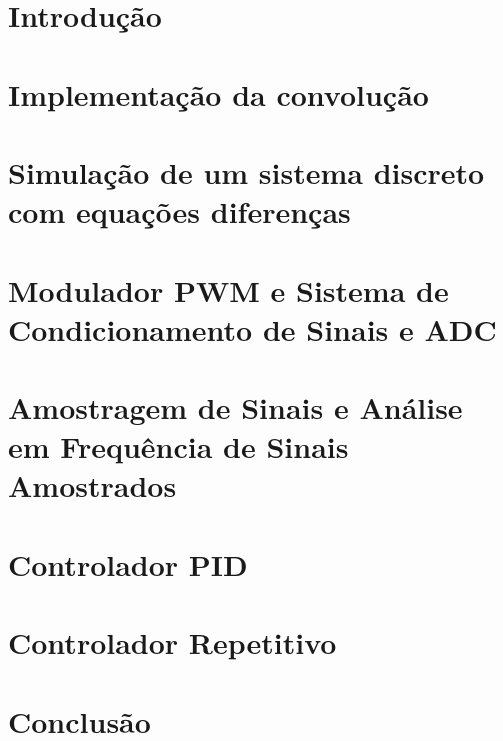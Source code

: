 \documentclass[capchap,sumarioincompleto,a4paper,12pt,ruledheader,normaltoc]{utfprtex}%
\begin{document}
\capa
\newpage
\sumario
\newpage
\newpage

\chapter{Introdução}

\chapter{Implementação da convolução}


\chapter{Simulação de um sistema discreto com equações diferenças}


\chapter{Modulador PWM e Sistema de Condicionamento de Sinais e ADC}


\chapter{Amostragem de Sinais e Análise em Frequência de Sinais Amostrados}


\chapter{Controlador PID}


\chapter{Controlador Repetitivo}


%
%
%

\chapter{Conclusão}



\end{document}

